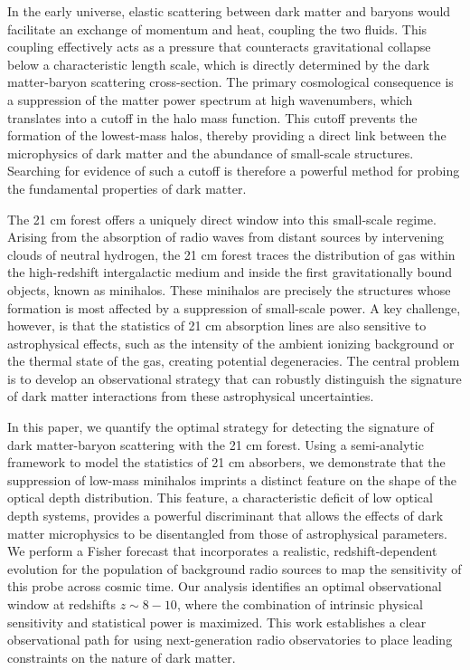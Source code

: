 \documentclass[]{article}
\begin{document}
In the early universe, elastic scattering between dark matter and baryons would facilitate an exchange of momentum and heat, coupling the two fluids. This coupling effectively acts as a pressure that counteracts gravitational collapse below a characteristic length scale, which is directly determined by the dark matter-baryon scattering cross-section. The primary cosmological consequence is a suppression of the matter power spectrum at high wavenumbers, which translates into a cutoff in the halo mass function. This cutoff prevents the formation of the lowest-mass halos, thereby providing a direct link between the microphysics of dark matter and the abundance of small-scale structures. Searching for evidence of such a cutoff is therefore a powerful method for probing the fundamental properties of dark matter.

The 21 cm forest offers a uniquely direct window into this small-scale regime. Arising from the absorption of radio waves from distant sources by intervening clouds of neutral hydrogen, the 21 cm forest traces the distribution of gas within the high-redshift intergalactic medium and inside the first gravitationally bound objects, known as minihalos. These minihalos are precisely the structures whose formation is most affected by a suppression of small-scale power. A key challenge, however, is that the statistics of 21 cm absorption lines are also sensitive to astrophysical effects, such as the intensity of the ambient ionizing background or the thermal state of the gas, creating potential degeneracies. The central problem is to develop an observational strategy that can robustly distinguish the signature of dark matter interactions from these astrophysical uncertainties.

In this paper, we quantify the optimal strategy for detecting the signature of dark matter-baryon scattering with the 21 cm forest. Using a semi-analytic framework to model the statistics of 21 cm absorbers, we demonstrate that the suppression of low-mass minihalos imprints a distinct feature on the shape of the optical depth distribution. This feature, a characteristic deficit of low optical depth systems, provides a powerful discriminant that allows the effects of dark matter microphysics to be disentangled from those of astrophysical parameters. We perform a Fisher forecast that incorporates a realistic, redshift-dependent evolution for the population of background radio sources to map the sensitivity of this probe across cosmic time. Our analysis identifies an optimal observational window at redshifts $z \sim 8-10$, where the combination of intrinsic physical sensitivity and statistical power is maximized. This work establishes a clear observational path for using next-generation radio observatories to place leading constraints on the nature of dark matter.
\end{document}
